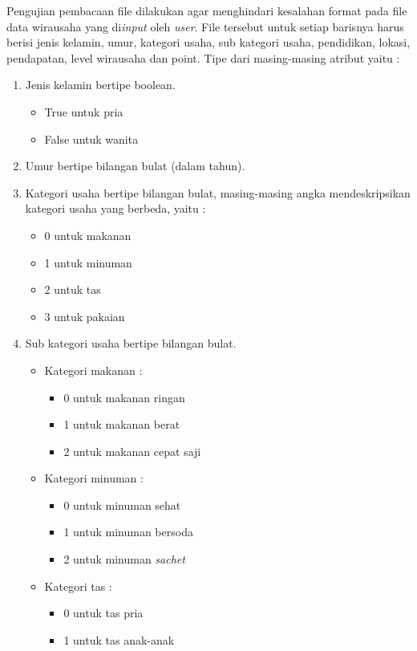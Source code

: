 Pengujian pembacaan file dilakukan agar menghindari kesalahan format pada file data wirausaha yang di\textit{input} oleh \textit{user}. File tersebut untuk setiap barisnya harus berisi jenis kelamin, umur, kategori usaha, sub kategori usaha, pendidikan, lokasi, pendapatan, level wirausaha dan point.
Tipe dari masing-masing atribut yaitu :
\begin{enumerate}
	\item Jenis kelamin bertipe boolean.\\
	\begin{itemize}
		\item True untuk pria
		\item False untuk wanita
	\end{itemize}
	\item Umur bertipe bilangan bulat (dalam tahun).
	\item Kategori usaha bertipe bilangan bulat, masing-masing angka mendeskripsikan kategori usaha yang berbeda, yaitu :
		\begin{itemize}
			\item 0 untuk makanan
			\item 1 untuk minuman
			\item 2 untuk tas
			\item 3 untuk pakaian
		\end{itemize}
	\item Sub kategori usaha bertipe bilangan bulat.
		\begin{itemize}
			\item Kategori makanan :
				\begin{itemize}
					\item 0 untuk makanan ringan
					\item 1 untuk makanan berat
					\item 2 untuk makanan cepat saji
				\end{itemize}
			\item Kategori minuman :
				\begin{itemize}
					\item 0 untuk minuman sehat
					\item 1 untuk minuman bersoda
					\item 2 untuk minuman \textit{sachet}
				\end{itemize}
			\item Kategori tas :
				\begin{itemize}
					\item 0 untuk tas pria
					\item 1 untuk tas anak-anak

\end{itemize}
\end{itemize}
\end{enumerate}

